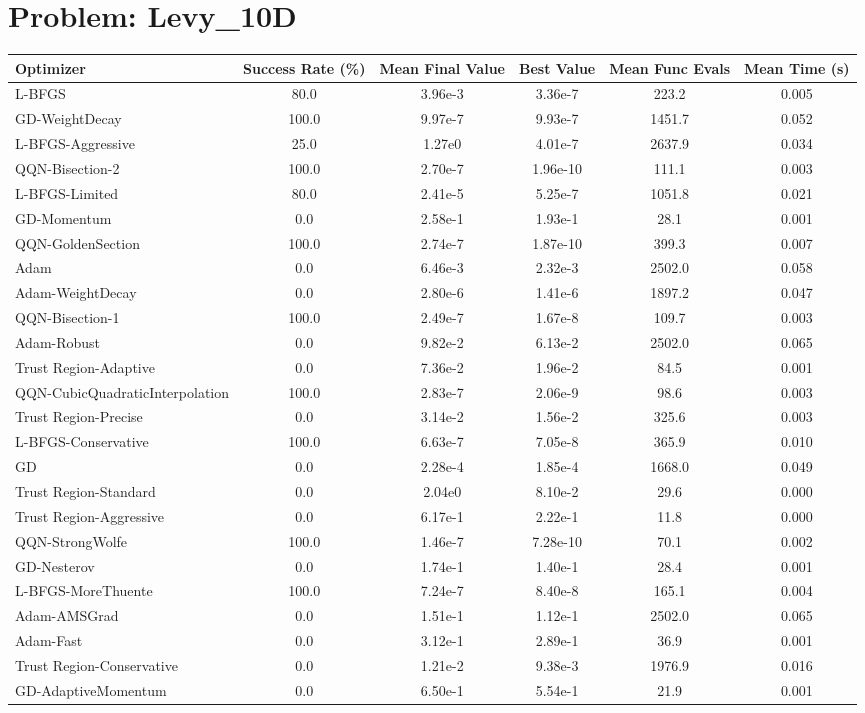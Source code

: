 \documentclass{article}
\begin{document}
\section{Problem: Levy\_10D}
\begin{longtable}{p{3cm}*{5}{c}}
\toprule
\textbf{Optimizer} & \textbf{Success Rate (\%)} & \textbf{Mean Final Value} & \textbf{Best Value} & \textbf{Mean Func Evals} & \textbf{Mean Time (s)} \\
\midrule
L-BFGS & 80.0 & 3.96e-3 & 3.36e-7 & 223.2 & 0.005 \\
GD-WeightDecay & 100.0 & 9.97e-7 & 9.93e-7 & 1451.7 & 0.052 \\
L-BFGS-Aggressive & 25.0 & 1.27e0 & 4.01e-7 & 2637.9 & 0.034 \\
QQN-Bisection-2 & 100.0 & 2.70e-7 & 1.96e-10 & 111.1 & 0.003 \\
L-BFGS-Limited & 80.0 & 2.41e-5 & 5.25e-7 & 1051.8 & 0.021 \\
GD-Momentum & 0.0 & 2.58e-1 & 1.93e-1 & 28.1 & 0.001 \\
QQN-GoldenSection & 100.0 & 2.74e-7 & 1.87e-10 & 399.3 & 0.007 \\
Adam & 0.0 & 6.46e-3 & 2.32e-3 & 2502.0 & 0.058 \\
Adam-WeightDecay & 0.0 & 2.80e-6 & 1.41e-6 & 1897.2 & 0.047 \\
QQN-Bisection-1 & 100.0 & 2.49e-7 & 1.67e-8 & 109.7 & 0.003 \\
Adam-Robust & 0.0 & 9.82e-2 & 6.13e-2 & 2502.0 & 0.065 \\
Trust Region-Adaptive & 0.0 & 7.36e-2 & 1.96e-2 & 84.5 & 0.001 \\
QQN-CubicQuadraticInterpolation & 100.0 & 2.83e-7 & 2.06e-9 & 98.6 & 0.003 \\
Trust Region-Precise & 0.0 & 3.14e-2 & 1.56e-2 & 325.6 & 0.003 \\
L-BFGS-Conservative & 100.0 & 6.63e-7 & 7.05e-8 & 365.9 & 0.010 \\
GD & 0.0 & 2.28e-4 & 1.85e-4 & 1668.0 & 0.049 \\
Trust Region-Standard & 0.0 & 2.04e0 & 8.10e-2 & 29.6 & 0.000 \\
Trust Region-Aggressive & 0.0 & 6.17e-1 & 2.22e-1 & 11.8 & 0.000 \\
QQN-StrongWolfe & 100.0 & 1.46e-7 & 7.28e-10 & 70.1 & 0.002 \\
GD-Nesterov & 0.0 & 1.74e-1 & 1.40e-1 & 28.4 & 0.001 \\
L-BFGS-MoreThuente & 100.0 & 7.24e-7 & 8.40e-8 & 165.1 & 0.004 \\
Adam-AMSGrad & 0.0 & 1.51e-1 & 1.12e-1 & 2502.0 & 0.065 \\
Adam-Fast & 0.0 & 3.12e-1 & 2.89e-1 & 36.9 & 0.001 \\
Trust Region-Conservative & 0.0 & 1.21e-2 & 9.38e-3 & 1976.9 & 0.016 \\
GD-AdaptiveMomentum & 0.0 & 6.50e-1 & 5.54e-1 & 21.9 & 0.001 \\
\bottomrule
\end{longtable}
\end{document}

